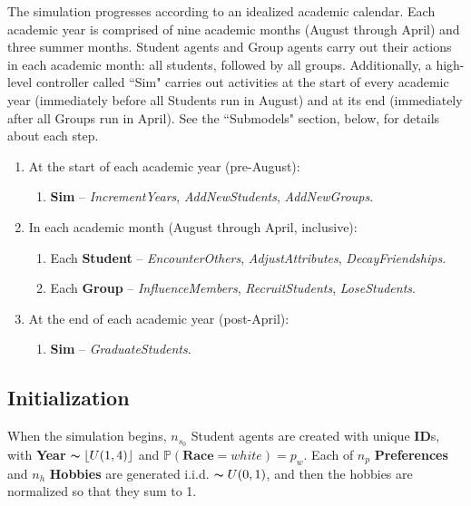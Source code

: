 The simulation progresses according to an idealized academic calendar. Each
academic year is comprised of nine academic months (August through April) and
three summer months. Student agents and Group agents carry out their actions
in each academic month: all students, followed by all groups. Additionally, a
high-level controller called ``Sim" carries out activities at the start of
every academic year (immediately before all Students run in August) and at its
end (immediately after all Groups run in April). See the ``Submodels" section,
below, for details about each step.

\begin{enumerate}
\itemsep.1em
\item At the start of each academic year (pre-August):

    \begin{enumerate}
    \itemsep.1em
    \item \textbf{Sim} -- \textsl{IncrementYears}, \textsl{AddNewStudents},
\textsl{AddNewGroups}.
    \end{enumerate}

\item In each academic month (August through April, inclusive):

    \begin{enumerate}
    \itemsep.1em
    \item Each \textbf{Student} -- \textsl{EncounterOthers},
\textsl{AdjustAttributes}, \textsl{DecayFriendships}. 
    \item Each \textbf{Group} -- \textsl{InfluenceMembers},
\textsl{RecruitStudents}, \textsl{LoseStudents}.
    \end{enumerate}

\item At the end of each academic year (post-April):

    \begin{enumerate}
    \itemsep.1em
    \item \textbf{Sim} -- \textsl{GraduateStudents}. %
    \end{enumerate}
\end{enumerate}

\subsection{Initialization}

When the simulation begins, $n_{s_0}$ Student agents are created with unique
\textbf{ID}s, with \textbf{Year} $\thicksim \left \lfloor U(1,4) \right
\rfloor$ and $\mathbb{P}(\textbf{Race}=white) = p_w$. Each of $n_p$
\textbf{Preferences} and $n_h$ \textbf{Hobbies} are generated i.i.d.
$\thicksim U(0,1)$, and then the hobbies are normalized so that they sum to 1.


